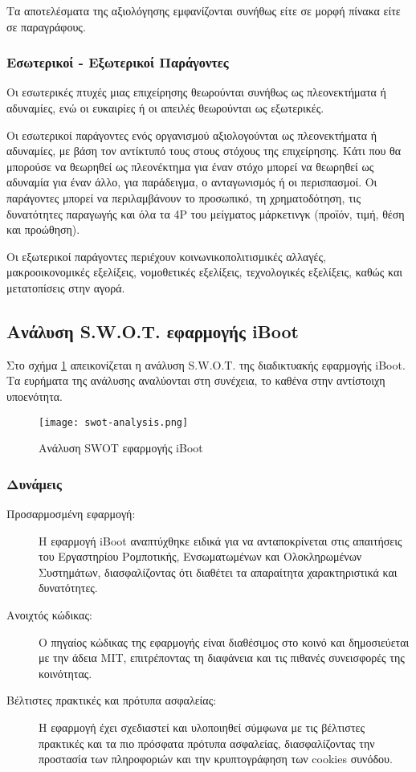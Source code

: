 Τα αποτελέσματα της αξιολόγησης εμφανίζονται συνήθως είτε σε μορφή πίνακα είτε σε παραγράφους.

\subsubsection{Εσωτερικοί - Εξωτερικοί Παράγοντες}
Οι εσωτερικές πτυχές μιας επιχείρησης θεωρούνται συνήθως ως πλεονεκτήματα ή αδυναμίες, ενώ οι ευκαιρίες ή οι απειλές θεωρούνται ως εξωτερικές.

Οι εσωτερικοί παράγοντες ενός οργανισμού αξιολογούνται ως πλεονεκτήματα ή αδυναμίες, με βάση τον αντίκτυπό τους στους στόχους της επιχείρησης. Κάτι που θα μπορούσε να θεωρηθεί ως πλεονέκτημα για έναν στόχο μπορεί να θεωρηθεί ως αδυναμία για έναν άλλο, για παράδειγμα, ο ανταγωνισμός ή οι περισπασμοί. Οι παράγοντες μπορεί να περιλαμβάνουν το προσωπικό, τη χρηματοδότηση, τις δυνατότητες παραγωγής και όλα τα 4P του μείγματος μάρκετινγκ (προϊόν, τιμή, θέση και προώθηση).

Οι εξωτερικοί παράγοντες περιέχουν κοινωνικοπολιτισμικές αλλαγές, μακροοικονομικές εξελίξεις, νομοθετικές εξελίξεις, τεχνολογικές εξελίξεις, καθώς και μετατοπίσεις στην αγορά.

\subsection{Ανάλυση S.W.O.T. εφαρμογής iBoot}
Στο σχήμα \ref{fig:iBoot_swot_analysis} απεικονίζεται η ανάλυση S.W.O.T. της διαδικτυακής εφαρμογής iBoot. Τα ευρήματα της ανάλυσης αναλύονται στη συνέχεια, το καθένα στην αντίστοιχη υποενότητα.

\begin{figure}[ht]
	\centering
	\texttt{[image: swot-analysis.png]}
	\caption{Ανάλυση SWOT εφαρμογής iBoot}
	\label{fig:iBoot_swot_analysis}
\end{figure}

\subsubsection{Δυνάμεις}
\begin{description}
	\item[Προσαρμοσμένη εφαρμογή:] Η εφαρμογή iBoot αναπτύχθηκε ειδικά για να ανταποκρίνεται στις απαιτήσεις του Εργαστηρίου Ρομποτικής, Ενσωματωμένων και Ολοκληρωμένων Συστημάτων, διασφαλίζοντας ότι διαθέτει τα απαραίτητα χαρακτηριστικά και δυνατότητες.
	\item[Ανοιχτός κώδικας:] Ο πηγαίος κώδικας της εφαρμογής είναι διαθέσιμος στο κοινό και δημοσιεύεται με την άδεια MIT, επιτρέποντας τη διαφάνεια και τις πιθανές συνεισφορές της κοινότητας.
	\item[Βέλτιστες πρακτικές και πρότυπα ασφαλείας:] Η εφαρμογή έχει σχεδιαστεί και υλοποιηθεί σύμφωνα με τις βέλτιστες πρακτικές και τα πιο πρόσφατα πρότυπα ασφαλείας, διασφαλίζοντας την προστασία των πληροφοριών και την κρυπτογράφηση των cookies συνόδου.
\end{description}

